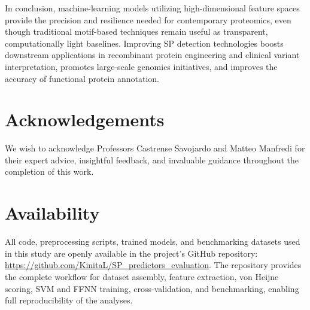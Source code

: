 \documentclass[unnumsec,webpdf,contemporary,large]{oup-authoring-template}
\begin{document}
In conclusion, machine-learning models utilizing high-dimensional feature spaces provide the precision and resilience needed for contemporary proteomics, even though traditional motif-based techniques remain useful as transparent, computationally light baselines. Improving SP detection technologies boosts downstream applications in recombinant protein engineering and clinical variant interpretation, promotes large-scale genomics initiatives, and improves the accuracy of functional protein annotation.

\section*{Acknowledgements}
We wish to acknowledge Professors Castrense Savojardo and Matteo Manfredi for their expert advice, insightful feedback, and invaluable guidance throughout the completion of this work.

\section*{Availability}
All code, preprocessing scripts, trained models, and benchmarking datasets used in this study are openly available in the project's GitHub repository: \url{https://github.com/KinitaL/SP_predictors_evaluation}. The repository provides the complete workflow for dataset assembly, feature extraction, von Heijne scoring, SVM and FFNN training, cross-validation, and benchmarking, enabling full reproducibility of the analyses.
\end{document}
